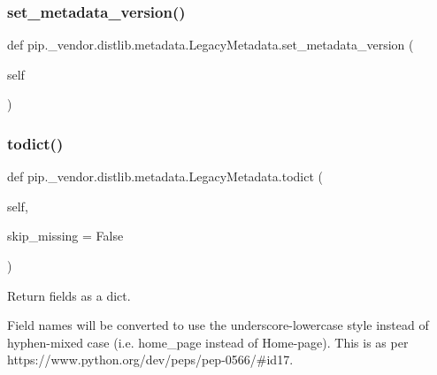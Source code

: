 \subsubsection{\texorpdfstring{set\+\_\+metadata\+\_\+version()}{set\_metadata\_version()}}
{\footnotesize\ttfamily def pip.\+\_\+vendor.\+distlib.\+metadata.\+Legacy\+Metadata.\+set\+\_\+metadata\+\_\+version (\begin{DoxyParamCaption}\item[{}]{self }\end{DoxyParamCaption})}

\mbox{\label{classpip_1_1__vendor_1_1distlib_1_1metadata_1_1LegacyMetadata_a536602a48821bb0182c5425f86f1116d}} 
\subsubsection{\texorpdfstring{todict()}{todict()}}
{\footnotesize\ttfamily def pip.\+\_\+vendor.\+distlib.\+metadata.\+Legacy\+Metadata.\+todict (\begin{DoxyParamCaption}\item[{}]{self,  }\item[{}]{skip\+\_\+missing = {\ttfamily False} }\end{DoxyParamCaption})}

\begin{DoxyVerb}Return fields as a dict.

Field names will be converted to use the underscore-lowercase style
instead of hyphen-mixed case (i.e. home_page instead of Home-page).
This is as per https://www.python.org/dev/peps/pep-0566/#id17.
\end{DoxyVerb}
 \mbox{\label{classpip_1_1__vendor_1_1distlib_1_1metadata_1_1LegacyMetadata_aaa801ea3f5e81ba75615504e09814b95}} 
